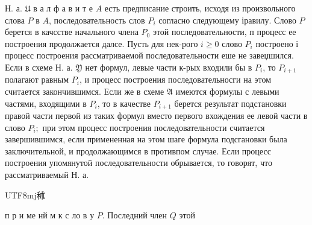 \documentclass[10pt]{article}
\begin{document}
Н. а. $\mathfrak{U}$ в а л ф а в и т е $A$ есть предписание строить, исходя из произвольного слова $P$ в $A$, последовательность слов $P_{i}$ согласно следующему іравилу. Слово $P$ берется в качсстве начального члена $P_{0}$ этой последовательности, п процесс ее построения продолжается далсе. Пусть для нек-рого $i \geqslant 0$ слово $P_{i}$ построено і процесс построения рассматриваемой последовательности еше не завеџшился. Если в схеме Н. а. $\mathfrak{Y}$ нет формул, левые части к-рых входили бы в $P_{i}$, то $P_{i+1}$ полагают равным $P_{i}$, и процесс построения последовательносги на этом считается закончившимся. Если же в схеме $\mathfrak{A}$ имеются формулы с левыми частями, входящими в $P_{i}$, то в качестве $P_{i+1}$ берется результат подстановки правой части первой из таких формул вместо первого вхождения ее левой части в слово $P_{i} ;$ при этом процесс построения последовательности считается завершившимся, если примененная на этом шаге формула подсгановки была заключительной, и продолжающимся в противпом случае. Если процесс построения упомянутой последовательности обрывается, то говорят, что рассматриваемый Н. а. \begin{CJK}{UTF8}{mj}秫\end{CJK} п р и ме нй м к с ло в у $P$. Последний член $Q$ этой
\end{document}
